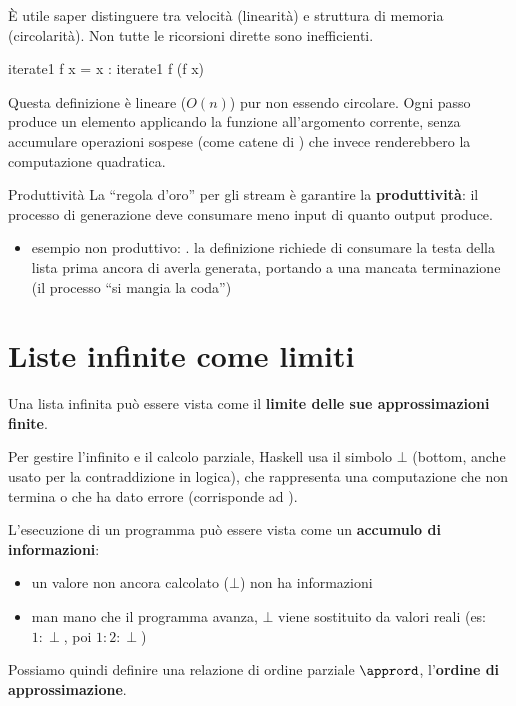 È utile saper distinguere tra velocità (linearità) e struttura di memoria (circolarità). Non tutte le ricorsioni dirette sono inefficienti.
\begin{haskellbox}{}
iterate1 f x = x : iterate1 f (f x)
\end{haskellbox}

Questa definizione è lineare ($O(n)$) pur non essendo circolare. Ogni passo produce un elemento applicando la funzione all'argomento corrente, senza accumulare operazioni sospese (come catene di ) che invece renderebbero la computazione quadratica.

\begin{gframe}{Produttività}
La ``regola d'oro'' per gli stream è garantire la \textbf{produttività}: il processo di generazione deve consumare meno input di quanto output produce. 
\begin{itemize}
    \item esempio non produttivo: .
    \subitem la definizione richiede di consumare la testa della lista prima ancora di averla generata, portando a una mancata terminazione (il processo ``si mangia la coda'')
\end{itemize}
\end{gframe}

\section{Liste infinite come limiti}
Una lista infinita può essere vista come il \textbf{limite delle sue approssimazioni finite}.

Per gestire l'infinito e il calcolo parziale, Haskell usa il simbolo $\bot$ (bottom, anche usato per la contraddizione in logica), che rappresenta una computazione che non termina o che ha dato errore (corrisponde ad ).

L'esecuzione di un programma può essere vista come un \textbf{accumulo di informazioni}:
\begin{itemize}
    \item un valore non ancora calcolato ($\bot$) non ha informazioni
    \item man mano che il programma avanza, $\bot$ viene sostituito da valori reali (es: $1:\perp$, poi $1:2:\perp$)
\end{itemize}

Possiamo quindi definire una relazione di ordine parziale $\apprord$, l'\textbf{ordine di approssimazione}.

